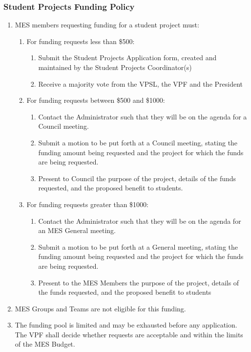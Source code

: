 \subsubsection{Student Projects Funding Policy}
\label{student-projects-funding-policy}
\begin{enumerate}
 \item
  MES members requesting funding for a student project must:

  \begin{enumerate}
   \item
    For funding requests less than \$500:

    \begin{enumerate}
     \item
      Submit the Student Projects Application form, created and maintained by the Student Projects Coordinator(s)
     \item
      Receive a majority vote from the VPSL, the VPF and the President
    \end{enumerate}
   \item
    For funding requests between \$500 and \$1000:

    \begin{enumerate}
     \item
      Contact the Administrator such that they will be on the agenda for a Council meeting.
     \item
      Submit a motion to be put forth at a Council meeting, stating the funding amount being requested and the project for which the funds are being requested.
     \item
      Present to Council the purpose of the project, details of the funds requested, and the proposed benefit to students.
    \end{enumerate}
   \item
    For funding requests greater than \$1000:

    \begin{enumerate}
     \item
      Contact the Administrator such that they will be on the agenda for an MES General meeting.
     \item
      Submit a motion to be put forth at a General meeting, stating the funding amount being requested and the project for which the funds are being requested.
     \item
      Present to the MES Members the purpose of the project, details of the funds requested, and the proposed benefit to students
    \end{enumerate}
  \end{enumerate}
 \item
  MES Groups and Teams are not eligible for this funding.
 \item
  The funding pool is limited and may be exhausted before any application. The VPF shall decide whether requests are acceptable and within the limits of the MES Budget.

\end{enumerate}

